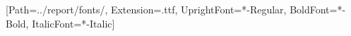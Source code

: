 \usepackage{fontspec}
\setmainfont{OldStandard}[Path=../report/fonts/, Extension=.ttf, UprightFont=*-Regular, BoldFont=*-Bold, ItalicFont=*-Italic]
\linespread{1.3}   %
\usepackage{titlesec}
\titleformat{\section}{\fontsize{14}{17}\selectfont\bfseries}{}{0pt}{}
\titleformat{\subsection}{\fontsize{12}{15}\selectfont\bfseries}{}{0pt}{}
\titleformat{\subsubsection}{\normalsize\bfseries\itshape}{}{0pt}{}
\titlespacing*{\section}{0pt}{16pt}{6pt}
\titlespacing*{\subsection}{0pt}{10pt}{4pt}
\setlength{\parskip}{7pt}
\usepackage{caption}
\captionsetup{font=small, labelfont=bf}
\makeatletter
\renewcommand{\maketitle}{%
  \begin{center}
    \rule{\textwidth}{1pt}\par\vspace{10pt}
    {\fontsize{20}{24}\selectfont\bfseries\MakeUppercase{\@title}\footnote{Research conducted at the Apart AI x Epistemics Research Sprint, November 2026.}\par}
    \vspace{8pt}\rule{\textwidth}{1pt}\par\vspace{14pt}
    {\@author\par}\vspace{6pt}
    {\bfseries With}\\Apart Research\par
  \end{center}\vspace{4pt}}

